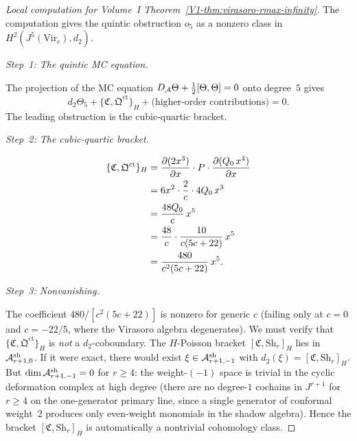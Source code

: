 \begin{proof}[Local computation for Volume~I Theorem~\textup{\ref{V1-thm:virasoro-rmax-infinity}}]
The computation gives the quintic obstruction $o_5$ as a nonzero
class in $H^2(J^5(\mathrm{Vir}_c), d_2)$.

\medskip
\emph{Step~1: The quintic MC equation.}

The projection of the MC equation
$D_{\mathcal{A}} \Theta + \frac{1}{2}[\Theta, \Theta] = 0$
onto degree~$5$ gives
\begin{equation}%
d_2 \Theta_5 +
\{\mathfrak{C}, \mathfrak{Q}^{\mathrm{ct}}\}_H
+ \text{(higher-order contributions)} = 0.
\end{equation}
The leading obstruction is the cubic-quartic bracket.

\medskip
\emph{Step~2: The cubic-quartic bracket.}

\begin{align}
\{\mathfrak{C}, \mathfrak{Q}^{\mathrm{ct}}\}_H
&= \frac{\partial(2x^3)}{\partial x}
 \cdot P \cdot
 \frac{\partial(Q_0\,x^4)}{\partial x} \notag \\
&= 6x^2 \cdot \frac{2}{c} \cdot 4Q_0\,x^3 \notag \\
&= \frac{48Q_0}{c}\,x^5 \notag \\
&= \frac{48}{c} \cdot \frac{10}{c(5c+22)}\,x^5 \notag \\
&= \frac{480}{c^2(5c+22)}\,x^5.
\end{align}

\medskip
\emph{Step~3: Nonvanishing.}

The coefficient $480/[c^2(5c+22)]$ is nonzero for
generic $c$ (failing only at $c = 0$ and $c = -22/5$,
where the Virasoro algebra degenerates). We must verify
that $\{\mathfrak{C}, \mathfrak{Q}^{\mathrm{ct}}\}_H$
is \emph{not} a $d_2$-coboundary. The $H$-Poisson
bracket $[\mathfrak{C}, \mathrm{Sh}_r]_H$ lies in
$\mathcal{A}^{\mathrm{sh}}_{r+1,0}$. If it were exact, there
would exist $\xi \in \mathcal{A}^{\mathrm{sh}}_{r+1,-1}$ with
$d_2(\xi) = [\mathfrak{C}, \mathrm{Sh}_r]_H$. But
$\dim \mathcal{A}^{\mathrm{sh}}_{r+1,-1} = 0$ for $r \geq 4$:
the weight-$({-}1)$ space is trivial in the cyclic
deformation complex at high degree (there are no degree-$1$
cochains in $J^{r+1}$ for $r \geq 4$ on the one-generator
primary line, since a single generator of conformal
weight~$2$ produces only even-weight monomials in the
shadow algebra). Hence the bracket
$[\mathfrak{C}, \mathrm{Sh}_r]_H$ is automatically a
nontrivial cohomology class.


\end{proof}
